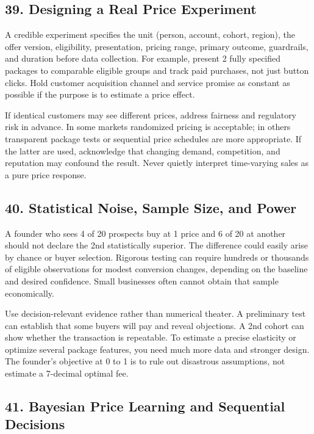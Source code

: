 \subsection*{39. Designing a Real Price Experiment}

A credible experiment specifies the unit (person, account, cohort, region), the offer version, eligibility, presentation, pricing range, primary outcome, guardrails, and duration before data collection. For example, present 2 fully specified packages to comparable eligible groups and track paid purchases, not just button clicks. Hold customer acquisition channel and service promise as constant as possible if the purpose is to estimate a price effect.

If identical customers may see different prices, address fairness and regulatory risk in advance. In some markets randomized pricing is acceptable; in others transparent package tests or sequential price schedules are more appropriate. If the latter are used, acknowledge that changing demand, competition, and reputation may confound the result. Never quietly interpret time-varying sales as a pure price response.

\subsection*{40. Statistical Noise, Sample Size, and Power}

A founder who sees 4 of 20 prospects buy at 1 price and 6 of 20 at another should not declare the 2nd statistically superior. The difference could easily arise by chance or buyer selection. Rigorous testing can require hundreds or thousands of eligible observations for modest conversion changes, depending on the baseline and desired confidence. Small businesses often cannot obtain that sample economically.

Use decision-relevant evidence rather than numerical theater. A preliminary test can establish that some buyers will pay and reveal objections. A 2nd cohort can show whether the transaction is repeatable. To estimate a precise elasticity or optimize several package features, you need much more data and stronger design. The founder's objective at 0 to 1 is to rule out disastrous assumptions, not estimate a 7-decimal optimal fee.

\subsection*{41. Bayesian Price Learning and Sequential Decisions}

